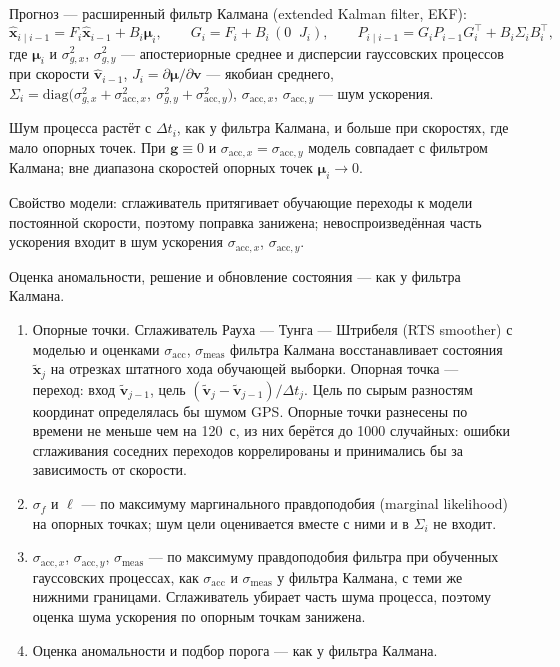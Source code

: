 \documentclass[a4paper,12pt]{report}
\makeatletter
\renewcommand\paragraph{\@startsection{paragraph}{4}{\z@}{3.25ex \@plus1ex \@minus.2ex}{1ex \@plus.2ex}{\normalfont\normalsize\bfseries}}
\makeatother
\begin{document}
	Прогноз --- расширенный фильтр Калмана (extended Kalman filter, EKF):
	\[
	\hat{\mathbf x}_{i\mid i-1}=F_i\hat{\mathbf x}_{i-1}+B_i\boldsymbol\mu_i,\qquad G_i=F_i+B_i\,(0\;\;J_i),\qquad P_{i\mid i-1}=G_iP_{i-1}G_i^\top+B_i\Sigma_iB_i^\top,
	\]
	где $\boldsymbol\mu_i$ и $\sigma_{g,x}^2$, $\sigma_{g,y}^2$ --- апостериорные среднее и дисперсии гауссовских процессов при скорости $\hat{\mathbf v}_{i-1}$, $J_i=\partial\boldsymbol\mu/\partial\mathbf v$ --- якобиан среднего, $\Sigma_i=\mathrm{diag}\bigl(\sigma_{g,x}^2+\sigma_{\mathrm{acc},x}^2,\ \sigma_{g,y}^2+\sigma_{\mathrm{acc},y}^2\bigr)$, $\sigma_{\mathrm{acc},x}$, $\sigma_{\mathrm{acc},y}$ --- шум ускорения.

	Шум процесса растёт с $\Delta t_i$, как у фильтра Калмана, и больше при скоростях, где мало опорных точек. При $\mathbf g\equiv0$ и $\sigma_{\mathrm{acc},x}=\sigma_{\mathrm{acc},y}$ модель совпадает с фильтром Калмана; вне диапазона скоростей опорных точек $\boldsymbol\mu_i\to0$.

	Свойство модели: сглаживатель притягивает обучающие переходы к модели постоянной скорости, поэтому поправка занижена; невоспроизведённая часть ускорения входит в шум ускорения $\sigma_{\mathrm{acc},x}$, $\sigma_{\mathrm{acc},y}$.

	Оценка аномальности, решение и обновление состояния --- как у фильтра Калмана.

	\paragraph{Обучение и выбор порога}

	\begin{enumerate}
		\item Опорные точки. Сглаживатель Рауха --- Тунга --- Штрибеля (RTS smoother) с моделью и оценками $\sigma_{\mathrm{acc}}$, $\sigma_{\mathrm{meas}}$ фильтра Калмана восстанавливает состояния $\tilde{\mathbf x}_j$ на отрезках штатного хода обучающей выборки. Опорная точка --- переход: вход $\tilde{\mathbf v}_{j-1}$, цель $(\tilde{\mathbf v}_j-\tilde{\mathbf v}_{j-1})/\Delta t_j$. Цель по сырым разностям координат определялась бы шумом GPS. Опорные точки разнесены по времени не меньше чем на 120~с, из них берётся до 1000 случайных: ошибки сглаживания соседних переходов коррелированы и принимались бы за зависимость от скорости.
		\item $\sigma_f$ и $\ell$ --- по максимуму маргинального правдоподобия (marginal likelihood) на опорных точках; шум цели оценивается вместе с ними и в $\Sigma_i$ не входит.
		\item $\sigma_{\mathrm{acc},x}$, $\sigma_{\mathrm{acc},y}$, $\sigma_{\mathrm{meas}}$ --- по максимуму правдоподобия фильтра при обученных гауссовских процессах, как $\sigma_{\mathrm{acc}}$ и $\sigma_{\mathrm{meas}}$ у фильтра Калмана, с теми же нижними границами. Сглаживатель убирает часть шума процесса, поэтому оценка шума ускорения по опорным точкам занижена.
		\item Оценка аномальности и подбор порога --- как у фильтра Калмана.
	\end{enumerate}
\end{document}
